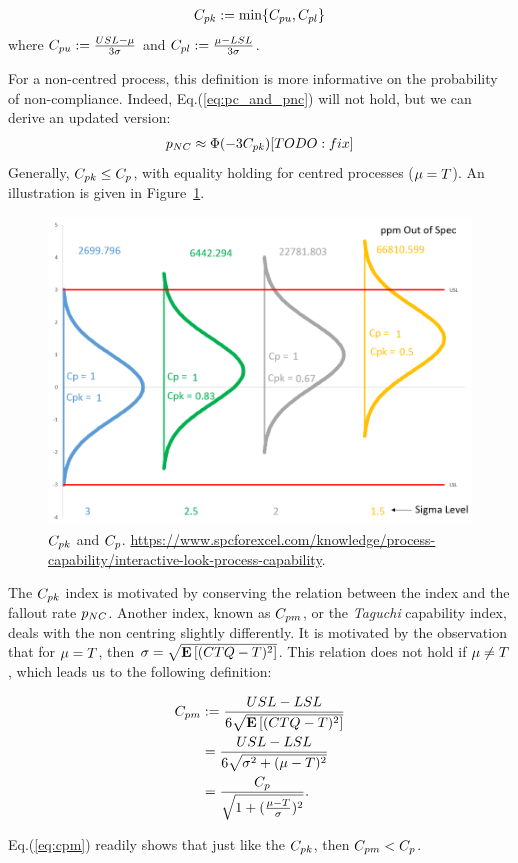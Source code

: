 \begin{definition}[$\cpk$]
\begin{align}
	C_{pk}:= \min\{ C_{pu},C_{pl} \}
\end{align}
where $C_{pu}:= \frac{USL- \mu}{3 \sigma}$ and $C_{pl}:= \frac{\mu-LSL}{3 \sigma}$.
\end{definition}
For a non-centred process, this definition is more informative on the probability of non-compliance.
Indeed, Eq.(\ref{eq:pc_and_pnc}) will not hold, but we can derive an updated version:
\begin{align}
	 p_{NC} \approx \Phi(-3 C_{pk})[TODO: fix]
\end{align}
Generally, $C_{pk} \leq C_p$, with equality holding for centred processes ($\mu=T$).
An illustration is given in Figure~\ref{fig:cpk}.


\begin{figure}
\centering
\includegraphics[height=0.3\textheight]{art/Cpk_same_sigma_varying_avg}
\caption[$\cpk$ and $\cp$]{$\cpk$ and $\cp$. \newline
\url{https://www.spcforexcel.com/knowledge/process-capability/interactive-look-process-capability}.}
\label{fig:cpk}
\end{figure}



The $\cpk$ index is motivated by conserving the relation between the index and the fallout rate $p_{NC}$.
Another index, known as $\cpm$, or the \emph{Taguchi} capability index, deals with the non centring slightly differently. It is motivated by the observation that for $\mu=T$, then $\sigma=\sqrt{\mathbf{E}\left[ (CTQ-T)^2 \right]}$. This relation does not hold if $\mu \not=T$, which leads us to the following definition:
\begin{definition}[$\cpm$]
\begin{align}
		C_{pm} &:= \frac{USL-LSL}{6 \sqrt{\mathbf{E}\left[ (CTQ-T)^2 \right]}} \\
		&= 	\frac{USL-LSL}{6 \sqrt{\sigma^2+(\mu-T)^2}} \\ 
		&= \frac{C_p}{\sqrt{1+(\frac{\mu-T}{\sigma})^2}}. \label{eq:cpm}
\end{align}
\end{definition}
Eq.(\ref{eq:cpm}) readily shows that just like the $\cpk$, then $C_{pm}<C_p$. 





